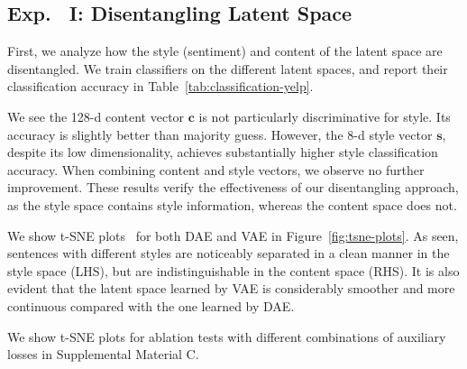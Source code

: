 \documentclass[11pt,a4paper]{article}
\begin{document}
\subsection{Exp.~ I: Disentangling Latent Space}

First, we analyze how the style (sentiment) and content of the latent space are disentangled.
We train classifiers on the different latent spaces, and report their classification accuracy in Table~\ref{tab:classification-yelp}.

We see the 128-d content vector $\bm c$ is not particularly discriminative for style.
Its accuracy is slightly better than majority guess.
However, the 8-d style vector $\bm s$, despite its low dimensionality, achieves substantially higher style classification accuracy.
When combining content and style vectors, we observe no further improvement.
These results verify the effectiveness of our disentangling approach, as the style space contains style information, whereas the content space does not.

We show t-SNE plots~\cite{maaten2008visualizing} for both DAE and VAE in Figure~\ref{fig:tsne-plots}.
As seen, sentences with different styles are noticeably separated in a clean manner in the style space (LHS), but are indistinguishable in the content space (RHS).
It is also evident that the latent space learned by VAE is considerably smoother and more continuous compared with the one learned by DAE.

We show t-SNE plots for ablation tests with different combinations of auxiliary losses in Supplemental Material C.
\end{document}
